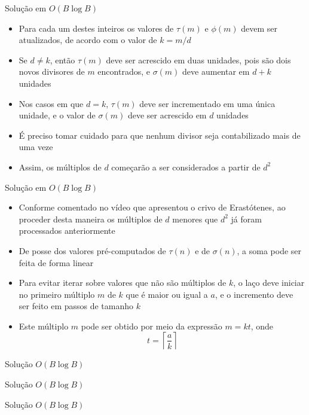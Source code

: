 \begin{frame}[fragile]{Solução em $O(B\log B)$}

    \begin{itemize}
        \item Para cada um destes inteiros os valores de $\tau(m)$ e $\phi(m)$ devem ser 
            atualizados, de acordo com o valor de $k = m/d$

        \item Se $d\neq k$, então $\tau(m)$ deve ser acrescido em duas unidades, pois são
            dois novos divisores de $m$ encontrados, e $\sigma(m)$ deve aumentar em $d + k$
            unidades

        \item Nos casos em que $d = k$, $\tau(m)$ deve ser incrementado em uma única unidade,
            e o valor de $\sigma(m)$ deve ser acrescido em $d$ unidades

        \item É preciso tomar cuidado para que nenhum divisor seja contabilizado mais de uma 
            veze

        \item Assim, os múltiplos de $d$ começarão a ser considerados a partir de $d^2$
    \end{itemize}

\end{frame}

\begin{frame}[fragile]{Solução em $O(B\log B)$}

    \begin{itemize}
        \item Conforme comentado no vídeo que apresentou o crivo de Erastótenes, ao proceder
            desta maneira os múltiplos de $d$ menores que $d^2$ já foram processados anteriormente

        \item De posse dos valores pré-computados de $\tau(n)$ e de $\sigma(n)$, a soma pode
            ser feita de forma linear 

        \item Para evitar iterar sobre valores que não são múltiplos de $k$, o laço deve iniciar
            no primeiro múltiplo $m$ de $k$ que é maior ou igual a $a$, e o incremento deve ser feito
            em passos de tamanho $k$

        \item Este múltiplo $m$ pode ser obtido por meio da expressão $m = kt$, onde
        $$
            t = \left\lceil \frac{a}{k} \right\rceil
        $$
    \end{itemize}

\end{frame}
\begin{frame}[fragile]{Solução $O(B\log B)$}
\end{frame}

\begin{frame}[fragile]{Solução $O(B\log B)$}
\end{frame}

\begin{frame}[fragile]{Solução $O(B\log B)$}
\end{frame}
